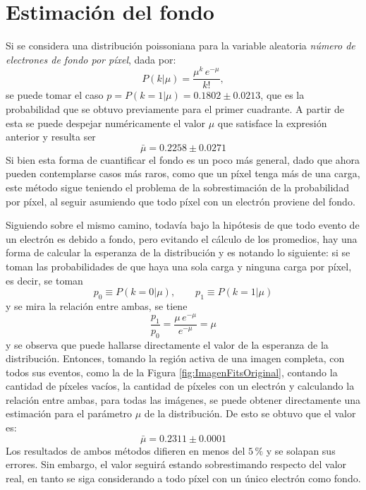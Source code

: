 \section{Estimación del fondo}
\noindent Si se considera una distribución poissoniana para la variable aleatoria \textit{número de electrones de fondo por píxel}, dada por:
\begin{equation*}
    P(k|\mu) = \frac{\mu^{k}\,e^{-\mu}}{k!},
\end{equation*}
se puede tomar el caso $p = P(k = 1 | \mu) = 0.1802 \pm 0.0213$, que es la probabilidad que se obtuvo previamente para el primer cuadrante. A partir de esta se puede despejar numéricamente el valor $\mu$ que satisface la expresión anterior y resulta ser
\begin{equation*}
    \bar{\mu} = 0.2258 \pm 0.0271
\end{equation*}
Si bien esta forma de cuantificar el fondo es un poco más general, dado que ahora pueden contemplarse casos más raros, como que un píxel tenga más de una carga, este método sigue teniendo el problema de la sobrestimación de la probabilidad por píxel, al seguir asumiendo que todo píxel con un electrón proviene del fondo.

Siguiendo sobre el mismo camino, todavía bajo la hipótesis de que todo evento de un electrón es debido a fondo, pero evitando el cálculo de los promedios, hay una forma de calcular la esperanza de la distribución y es notando lo siguiente: si se toman las probabilidades de que haya una sola carga y ninguna carga por píxel, es decir, se toman
\begin{equation*}
    p_{0} \equiv P(k = 0 | \mu),
    \quad
    \quad
    p_{1} \equiv P(k = 1 | \mu)
\end{equation*}
y se mira la relación entre ambas, se tiene
\begin{equation*}
    \frac{p_{1}}{p_{0}} = \frac{\mu\,e^{-\mu}}{e^{-\mu}} = \mu
\end{equation*}
y se observa que puede hallarse directamente el valor de la esperanza de la distribución. Entonces, tomando la región activa de una imagen completa, con todos sus eventos, como la de la Figura \ref{fig:ImagenFitsOriginal}, contando la cantidad de píxeles vacíos, la cantidad de píxeles con un electrón y calculando la relación entre ambas, para todas las imágenes, se puede obtener directamente una estimación para el parámetro $\mu$ de la distribución. De esto se obtuvo que el valor es:
\begin{equation*}
    \bar{\mu} = 0.2311 \pm 0.0001
\end{equation*}
Los resultados de ambos métodos difieren en menos del $5\,\%$ y se solapan sus errores. 
Sin embargo, el valor seguirá estando sobrestimando respecto del valor real, en tanto se siga considerando a todo píxel con un único electrón como fondo.

